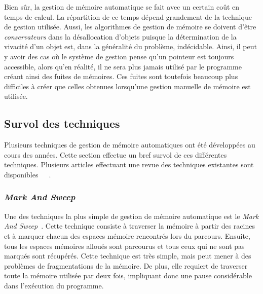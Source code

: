 \documentclass[12pt,twoside,letterpaper,francais]{book}
\begin{document}
Bien sûr, la gestion de mémoire automatique se fait avec un certain
coût en temps de calcul. La répartition de ce temps dépend grandement
de la technique de gestion utilisée. Aussi, les algorithmes de gestion
de mémoire se doivent d'être \emph{conservateurs} dans la
désallocation d'objets puisque la détermination de la vivacité d'un
objet est, dans la généralité du problème, indécidable. Ainsi, il peut
y avoir des cas où le système de gestion pense qu'un pointeur est
toujours accessible, alors qu'en réalité, il ne sera plus jamais
utilisé par le programme créant ainsi des fuites de mémoires. Ces
fuites sont toutefois beaucoup plus difficiles à créer que celles
obtenues lorsqu'une gestion manuelle de mémoire est utilisée.


\FloatBarrier
\subsection{Survol des techniques}
Plusieurs techniques de gestion de mémoire automatiques ont été
développées au cours des années. Cette section effectue un bref survol
de ces différentes techniques. Plusieurs articles effectuant une revue
des techniques existantes sont
disponibles~\cite{GC_REVIEW1}~\cite{GC_REVIEW2}~\cite{GC_REVIEW3}.


\FloatBarrier
\subsubsection{\textit{Mark And Sweep}}
Une des techniques la plus simple de gestion de mémoire automatique
est le \textit{Mark And Sweep}~\cite{LISP_ORIGINS}. Cette technique
consiste à traverser la mémoire à partir des racines et à marquer
chacun des espaces mémoire rencontrés lors du parcours. Ensuite, tous
les espaces mémoires alloués sont parcourus et tous ceux qui ne sont
pas marqués sont récupérés. Cette technique est très simple, mais peut
mener à des problèmes de fragmentations de la mémoire. De plus, elle
requiert de traverser toute la mémoire utilisée par deux fois,
impliquant donc une pause considérable dans l'exécution du programme.


\FloatBarrier
\end{document}
